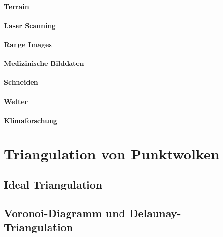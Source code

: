 \documentclass[a4paper, 11pt, accentcolor = tud3b]{tudreport}
\begin{document}
			\paragraph{Terrain} %

			\paragraph{Laser Scanning} %

			\paragraph{Range Images} %

			\paragraph{Medizinische Bilddaten} %

			\paragraph{Schneiden} %

			\paragraph{Wetter} %

			\paragraph{Klimaforschung} %

		\section{Triangulation von Punktwolken} %

			\subsection{Ideal Triangulation} %

			\subsection{Voronoi-Diagramm und Delaunay-Triangulation} %
\end{document}

